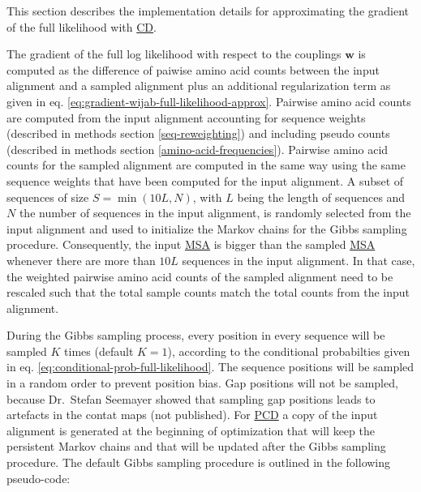 \documentclass[11pt,a4paper,twoside]{book}
\newcommand{\eq}{\!=\!}
\newcommand{\w}{\mathbf{w}}
\theoremstyle{definition}
\theoremstyle{definition}
\theoremstyle{remark}
\begin{document}
This section describes the implementation details for approximating the
gradient of the full likelihood with \protect\hyperlink{abbrev}{CD}.

The gradient of the full log likelihood with respect to the couplings
\(\w\) is computed as the difference of paiwise amino acid counts
between the input alignment and a sampled alignment plus an additional
regularization term as given in eq.
\eqref{eq:gradient-wijab-full-likelihood-approx}. Pairwise amino acid
counts are computed from the input alignment accounting for sequence
weights (described in methods section \ref{seq-reweighting}) and
including pseudo counts (described in methods section
\ref{amino-acid-frequencies}). Pairwise amino acid counts for the
sampled alignment are computed in the same way using the same sequence
weights that have been computed for the input alignment. A subset of
sequences of size \(S \eq \min(10L, N)\), with \(L\) being the length of
sequences and \(N\) the number of sequences in the input alignment, is
randomly selected from the input alignment and used to initialize the
Markov chains for the Gibbs sampling procedure. Consequently, the input
\protect\hyperlink{abbrev}{MSA} is bigger than the sampled
\protect\hyperlink{abbrev}{MSA} whenever there are more than \(10L\)
sequences in the input alignment. In that case, the weighted pairwise
amino acid counts of the sampled alignment need to be rescaled such that
the total sample counts match the total counts from the input alignment.

During the Gibbs sampling process, every position in every sequence will
be sampled \(K\) times (default \(K\eq1\)), according to the conditional
probabilties given in eq. \eqref{eq:conditional-prob-full-likelihood}. The
sequence positions will be sampled in a random order to prevent position
bias. Gap positions will not be sampled, because Dr.~Stefan Seemayer
showed that sampling gap positions leads to artefacts in the contat maps
(not published). For \protect\hyperlink{abbrev}{PCD} a copy of the input
alignment is generated at the beginning of optimization that will keep
the persistent Markov chains and that will be updated after the Gibbs
sampling procedure. The default Gibbs sampling procedure is outlined in
the following pseudo-code:
\end{document}
